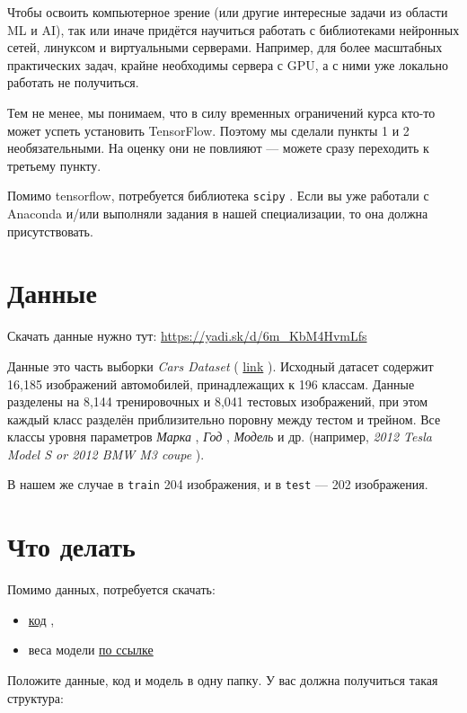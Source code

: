 \documentclass[11pt,a4paper]{article}
\begin{document}
Чтобы освоить компьютерное зрение (или другие интересные задачи из области ML и AI), так или иначе придётся научиться работать с библиотеками нейронных сетей, линуксом и виртуальными серверами. Например, для более масштабных практических задач, крайне необходимы сервера с GPU, а с ними уже локально работать не получиться.

Тем не менее, мы понимаем, что в силу временных ограничений курса кто-то может успеть установить TensorFlow. Поэтому мы сделали пункты 1 и 2 необязательными. На оценку они не повлияют — можете сразу переходить к третьему пункту.

Помимо tensorflow, потребуется библиотека \texttt{scipy} . Если вы уже работали с Anaconda и/или выполняли задания в нашей специализации, то она должна присутствовать.

\section{Данные}

Скачать данные нужно тут: \href{https://yadi.sk/d/6m\_KbM4HvmLfs}{https://yadi.sk/d/6m\_KbM4HvmLfs}

Данные это часть выборки \textit{Cars Dataset} ( \href{http://ai.stanford.edu/\textasciitilde{}jkrause/cars/car\_dataset.html}{link} ). Исходный датасет содержит 16,185 изображений автомобилей, принадлежащих к 196 классам. Данные разделены на 8,144 тренировочных и 8,041 тестовых изображений, при этом каждый класс разделён приблизительно поровну между тестом и трейном. Все классы уровня параметров \textit{Марка} , \textit{Год} , \textit{Модель} и др. (например, \textit{2012 Tesla Model S or 2012 BMW M3 coupe} ).

В нашем же случае в \texttt{train} 204 изображения, и в \texttt{test} — 202 изображения.

\section{Что делать}

Помимо данных, потребуется скачать:

\begin{itemize}
\item \href{https://github.com/ton4eg/coursera\_pa}{код} ,
\item веса модели \href{https://yadi.sk/d/9-3kXyxRvnBwh}{по ссылке}
\end{itemize}

Положите данные, код и модель в одну папку. У вас должна получиться такая структура:
\end{document}
